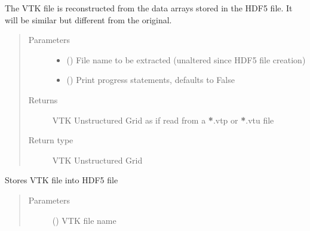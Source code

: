 \documentclass[letterpaper,10pt,english]{sphinxmanual}
\begin{document}
\begin{fulllineitems}
\begin{fulllineitems}
The VTK file is reconstructed from the data arrays stored in the HDF5 file. It will be similar but different from the original.
\begin{quote}\begin{description}
\item[{Parameters}] \leavevmode\begin{itemize}
\item {} 
 () \textendash{} File name to be extracted (unaltered since HDF5 file creation)

\item {} 
 (\sphinxstyleliteralemphasis{\sphinxupquote{, }}) \textendash{} Print progress statements, defaults to False

\end{itemize}

\item[{Returns}] \leavevmode
VTK Unstructured Grid as if read from a {\color{red}\bfseries{}*}.vtp or {\color{red}\bfseries{}*}.vtu file

\item[{Return type}] \leavevmode
VTK Unstructured Grid

\end{description}\end{quote}

\end{fulllineitems}


\begin{fulllineitems}
\label{\detokenize{openfdem:openfdem.aggregate_storage.aggregate_storage.store_file}}
Stores VTK file into HDF5 file
\begin{quote}\begin{description}
\item[{Parameters}] \leavevmode
{} () \textendash{} VTK file name

\end{description}\end{quote}

\end{fulllineitems}


\end{fulllineitems}
\end{document}
